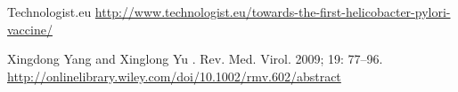 \documentclass{PresentationHEIGVD}
\begin{document}
\begin{frame}[allowframebreaks]
\begin{thebibliography}{10}
       \beamertemplateonlinebibitems
  Technologist.eu
    \newblock \url{http://www.technologist.eu/towards-the-first-helicobacter-pylori-vaccine/}     
    
  \beamertemplatearticlebibitems
    Xingdong Yang and Xinglong Yu
    .
    \newblock Rev. Med. Virol. 2009; 19: 77–96.
    \newblock \url{http://onlinelibrary.wiley.com/doi/10.1002/rmv.602/abstract}

  \end{thebibliography}
\end{frame}
\end{document}
